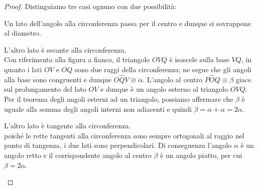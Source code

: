 \begin{proof}
Distinguiamo tre casi ognuno con due possibilità:
\begin{enumerate*}
\item Un lato dell'angolo alla circonferenza passa per il centro e 
dunque si sovrappone al diametro.
\begin{enumerate*}
\noindent\begin{minipage}{0.6\textwidth}\parindent15pt
\item L'altro lato è secante alla circonferenza.\\
Con riferimento alla figura a fianco, il triangolo \(OVQ\) è isoscele 
sulla base \(VQ\), in quanto i lati \(OV\) e \(OQ\) sono due raggi della 
circonferenza; ne segue che gli angoli alla base sono congruenti e 
dunque \(O\widehat{Q}V\cong \alpha\). L'angolo al centro 
\(P\widehat{O}Q\equiv \beta\) giace sul prolungamento del lato \(OV\) e 
dunque è un angolo esterno al triangolo \(OVQ\). Per il teorema degli 
angoli esterni ad un triangolo, possiamo affermare che \(\beta\) è 
uguale alla somma degli angoli interni non adiacenti e quindi \(\beta 
= \alpha + \alpha = 2\alpha\).
\end{minipage}\hfil
\noindent\hspace{-20pt}\begin{minipage}{0.4\textwidth}
  \centering
\end{minipage}
\noindent\begin{minipage}{0.6\textwidth}\parindent15pt
\item L'altro lato è tangente alla circonferenza.\\ poiché le rette 
tangenti alla circonferenza sono sempre ortogonali al raggio nel 
punto di tangenza, i due lati sono perpendicolari. Di conseguenza 
l'angolo \(\alpha\) è un angolo retto e il corrispondente angolo al 
centro \(\beta\) è un angolo piatto, per cui \(\beta = 2\alpha\).
\end{minipage}\hfil
\noindent\hspace{-20pt}\begin{minipage}{0.4\textwidth}
  \centering
\end{minipage}
\end{enumerate*}


\end{enumerate*}
\end{proof}
